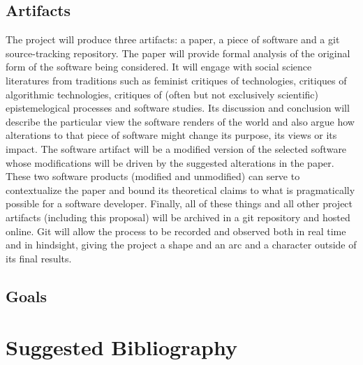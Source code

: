 \documentclass[a4paper,man,natbib]{apa6}
\begin{document}
   \subsection*{Artifacts}
   The project will produce three artifacts: a paper, a piece of software and a git source-tracking repository. The paper will provide formal analysis of the original form of the software being considered. It will engage with social science literatures from traditions such as feminist critiques of technologies, critiques of algorithmic technologies, critiques of (often but not exclusively scientific) epistemelogical processes and software studies. Its discussion and conclusion will describe the particular view the software renders of the world and also argue how alterations to that piece of software might change its purpose, its views or its impact. The software artifact will be a modified version of the selected software whose modifications will be driven by the suggested alterations in the paper. These two software products (modified and unmodified) can serve to contextualize the paper and bound its theoretical claims to what is pragmatically possible for a software developer. Finally, all of these things and all other project artifacts (including this proposal) will be archived in a git repository and hosted online. Git will allow the process to be recorded and observed both in real time and in hindsight, giving the project a shape and an arc and a character outside of its final results. 
   \subsection*{Goals}
   \clearpage
   \section{Suggested Bibliography}
\end{document}
